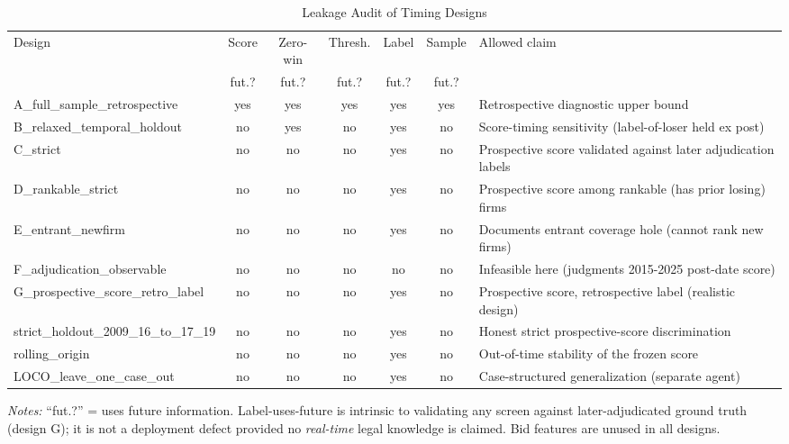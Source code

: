 \begin{table}[htbp]\centering
\caption{Leakage Audit of Timing Designs}
\label{tab:leakage_audit}
\scriptsize
\begin{tabular}{lcccccl}
\toprule
Design & Score & Zero-win & Thresh. & Label & Sample & Allowed claim \\
 & fut.? & fut.? & fut.? & fut.? & fut.? & \\
\midrule
A\_full\_sample\_retrospective & yes & yes & yes & yes & yes & Retrospective diagnostic upper bound \\
B\_relaxed\_temporal\_holdout & no & yes & no & yes & no & Score-timing sensitivity (label-of-loser held ex post) \\
C\_strict & no & no & no & yes & no & Prospective score validated against later adjudication labels \\
D\_rankable\_strict & no & no & no & yes & no & Prospective score among rankable (has prior losing) firms \\
E\_entrant\_newfirm & no & no & no & yes & no & Documents entrant coverage hole (cannot rank new firms) \\
F\_adjudication\_observable & no & no & no & no & no & Infeasible here (judgments 2015-2025 post-date score) \\
G\_prospective\_score\_retro\_label & no & no & no & yes & no & Prospective score, retrospective label (realistic design) \\
strict\_holdout\_2009\_16\_to\_17\_19 & no & no & no & yes & no & Honest strict prospective-score discrimination \\
rolling\_origin & no & no & no & yes & no & Out-of-time stability of the frozen score \\
LOCO\_leave\_one\_case\_out & no & no & no & yes & no & Case-structured generalization (separate agent) \\
\bottomrule
\end{tabular}
\begin{minipage}{\linewidth}\vspace{2pt}\scriptsize
\textit{Notes:} ``fut.?'' = uses future information. Label-uses-future is intrinsic to validating any screen against later-adjudicated ground truth (design G); it is not a deployment defect provided no \emph{real-time} legal knowledge is claimed. Bid features are unused in all designs.
\end{minipage}
\end{table}
